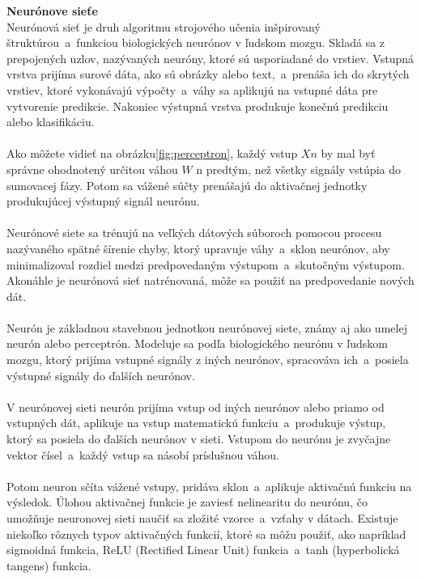     \textbf{Neurónove sieťe} \\
    Neurónová sieť je druh algoritmu strojového učenia inšpirovaný štruktúrou~a~funkciou biologických neurónov v
    ľudskom mozgu. Skladá sa z prepojených uzlov, nazývaných neuróny, ktoré sú usporiadané do vrstiev. Vstupná vrstva
    prijíma surové dáta, ako sú obrázky alebo text,~a~prenáša ich do skrytých vrstiev, ktoré vykonávajú výpočty~a~váhy
    sa aplikujú na vstupné dáta pre vytvorenie predikcie. Nakoniec výstupná vrstva produkuje konečnú predikciu
    alebo klasifikáciu.\\
    \\
    Ako môžete vidieť na obrázku\ref{fig:perceptron}, každý vstup $Xn$ by mal byť správne ohodnotený určitou
    váhou $W$ n predtým, než všetky signály vstúpia do sumovacej fázy. Potom sa vážené súčty prenášajú do aktivačnej
    jednotky produkujúcej výstupný signál neurónu.\\
    \\
    Neurónové siete sa trénujú na veľkých dátových súboroch pomocou procesu nazývaného spätné šírenie chyby, ktorý
    upravuje váhy~a~sklon neurónov, aby minimalizoval rozdiel medzi predpovedaným výstupom~a~skutočným výstupom.
    Akonáhle je neurónová sieť natrénovaná, môže sa použiť na predpovedanie nových dát.\\
    \\
    Neurón je základnou stavebnou jednotkou neurónovej siete, známy aj ako umelej neurón alebo perceptrón.
    Modeluje sa podľa biologického neurónu v ľudskom mozgu, ktorý prijíma vstupné signály z iných neurónov,
    spracováva ich~a~posiela výstupné signály do ďalších neurónov.\\
    \\
    V neurónovej sieti neurón prijíma vstup od iných neurónov alebo priamo od vstupných dát, aplikuje na vstup
    matematickú funkciu~a~produkuje výstup, ktorý sa posiela do ďalších neurónov v sieti. Vstupom do neurónu je
    zvyčajne vektor čísel~a~každý vstup sa násobí príslušnou váhou.\\
    \\
    Potom neuron sčíta vážené vstupy, pridáva sklon~a~aplikuje aktivačnú funkciu na výsledok. Úlohou aktivačnej
    funkcie je zaviesť nelinearitu do neurónu, čo umožňuje neuronovej sieti naučiť sa zložité vzorce~a~vzťahy v dátach.
    Existuje niekoľko rôznych typov aktivačných funkcií, ktoré sa môžu použiť, ako napríklad sigmoidná funkcia,
    ReLU (Rectified Linear Unit) funkcia~a~tanh (hyperbolická tangens) funkcia.\\
